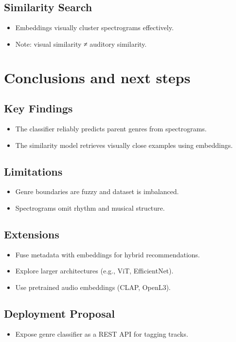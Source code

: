 \documentclass[
  letterpaper,
  DIV=11,
  numbers=noendperiod]{scrreprt}
\providecommand{\tightlist}{%
  \setlength{\itemsep}{0pt}\setlength{\parskip}{0pt}}
\begin{document}
\subsection{Similarity Search}\label{similarity-search-1}

\begin{itemize}
\tightlist
\item
  Embeddings visually cluster spectrograms effectively.
\item
  Note: visual similarity ≠ auditory similarity.
\end{itemize}

\section{Conclusions and next steps}\label{conclusions-and-next-steps}

\subsection{Key Findings}\label{key-findings}

\begin{itemize}
\tightlist
\item
  The classifier reliably predicts parent genres from spectrograms.
\item
  The similarity model retrieves visually close examples using
  embeddings.
\end{itemize}

\subsection{Limitations}\label{limitations}

\begin{itemize}
\tightlist
\item
  Genre boundaries are fuzzy and dataset is imbalanced.
\item
  Spectrograms omit rhythm and musical structure.
\end{itemize}

\subsection{Extensions}\label{extensions}

\begin{itemize}
\tightlist
\item
  Fuse metadata with embeddings for hybrid recommendations.
\item
  Explore larger architectures (e.g., ViT, EfficientNet).
\item
  Use pretrained audio embeddings (CLAP, OpenL3).
\end{itemize}

\subsection{Deployment Proposal}\label{deployment-proposal}

\begin{itemize}
\tightlist
\item
  Expose genre classifier as a REST API for tagging tracks.
\end{itemize}
\end{document}
